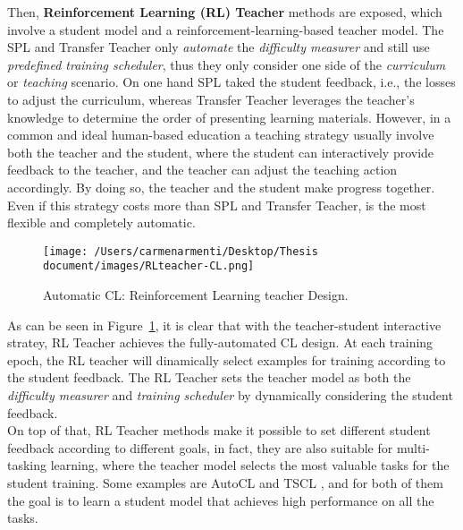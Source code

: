 Then, \textbf{Reinforcement Learning (RL) Teacher} methods are exposed, which involve a student model and a reinforcement-learning-based 
teacher model. The SPL and Transfer Teacher only \textit{automate} the \textit{difficulty measurer} and still use
\textit{predefined training scheduler}, thus they only consider one side of the \textit{curriculum} or \textit{teaching} scenario. On one hand
SPL taked the student feedback, i.e., the losses to adjust the curriculum, whereas Transfer Teacher leverages the teacher's knowledge
to determine the order of presenting learning materials. However, in a common and ideal human-based education a teaching strategy
usually involve both the teacher and the student, where the student can interactively provide feedback to the teacher, and the teacher 
can adjust the teaching action accordingly. By doing so, the teacher and the student make progress together.
Even if this strategy costs more than SPL and Transfer Teacher, is the most flexible and completely automatic.
\begin{figure}[h]
    \begin{center}
        \texttt{[image: /Users/carmenarmenti/Desktop/Thesis document/images/RLteacher-CL.png]}
        \caption{\label{fig:RLteacher-CL}Automatic CL: Reinforcement Learning teacher Design.}
    \end{center}
\end{figure}
As can be seen in Figure~\ref{fig:RLteacher-CL}, it is clear that with the teacher-student interactive
stratey, RL Teacher achieves the fully-automated CL design. At each training epoch, the RL teacher
will dinamically select examples for training according to the student feedback. The RL Teacher 
sets the teacher model as both the \textit{difficulty measurer} and \textit{training scheduler} by dynamically considering 
the student feedback.\\
On top of that, RL Teacher methods make it possible to set different student feedback according 
to different goals, in fact, they are also suitable for multi-tasking learning, where the teacher model 
selects the most valuable tasks for the student training. Some examples are AutoCL \cite{graves2017automated} and TSCL \cite{matiisen2019teacher}, and for both of them the goal is 
to learn a student model that achieves high performance on all the tasks.

